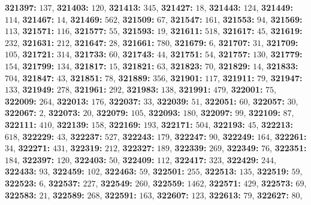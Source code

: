 \textsf{\bfseries 321397:} $137$, \textsf{\bfseries 321403:} $120$, \textsf{\bfseries 321413:} $345$, \textsf{\bfseries 321427:} $18$, \textsf{\bfseries 321443:} $124$, \textsf{\bfseries 321449:} $114$, \textsf{\bfseries 321467:} $14$, \textsf{\bfseries 321469:} $562$, \textsf{\bfseries 321509:} $67$, \textsf{\bfseries 321547:} $161$, \textsf{\bfseries 321553:} $94$, \textsf{\bfseries 321569:} $113$, \textsf{\bfseries 321571:} $116$, \textsf{\bfseries 321577:} $55$, \textsf{\bfseries 321593:} $19$, \textsf{\bfseries 321611:} $518$, \textsf{\bfseries 321617:} $45$, \textsf{\bfseries 321619:} $232$, \textsf{\bfseries 321631:} $212$, \textsf{\bfseries 321647:} $28$, \textsf{\bfseries 321661:} $780$, \textsf{\bfseries 321679:} $6$, \textsf{\bfseries 321707:} $31$, \textsf{\bfseries 321709:} $105$, \textsf{\bfseries 321721:} $314$, \textsf{\bfseries 321733:} $60$, \textsf{\bfseries 321743:} $44$, \textsf{\bfseries 321751:} $54$, \textsf{\bfseries 321757:} $130$, \textsf{\bfseries 321779:} $154$, \textsf{\bfseries 321799:} $134$, \textsf{\bfseries 321817:} $15$, \textsf{\bfseries 321821:} $63$, \textsf{\bfseries 321823:} $70$, \textsf{\bfseries 321829:} $14$, \textsf{\bfseries 321833:} $704$, \textsf{\bfseries 321847:} $43$, \textsf{\bfseries 321851:} $78$, \textsf{\bfseries 321889:} $356$, \textsf{\bfseries 321901:} $117$, \textsf{\bfseries 321911:} $79$, \textsf{\bfseries 321947:} $133$, \textsf{\bfseries 321949:} $278$, \textsf{\bfseries 321961:} $292$, \textsf{\bfseries 321983:} $138$, \textsf{\bfseries 321991:} $479$, \textsf{\bfseries 322001:} $75$, \textsf{\bfseries 322009:} $264$, \textsf{\bfseries 322013:} $176$, \textsf{\bfseries 322037:} $33$, \textsf{\bfseries 322039:} $51$, \textsf{\bfseries 322051:} $60$, \textsf{\bfseries 322057:} $30$, \textsf{\bfseries 322067:} $2$, \textsf{\bfseries 322073:} $20$, \textsf{\bfseries 322079:} $105$, \textsf{\bfseries 322093:} $180$, \textsf{\bfseries 322097:} $99$, \textsf{\bfseries 322109:} $87$, \textsf{\bfseries 322111:} $410$, \textsf{\bfseries 322139:} $158$, \textsf{\bfseries 322169:} $193$, \textsf{\bfseries 322171:} $504$, \textsf{\bfseries 322193:} $45$, \textsf{\bfseries 322213:} $618$, \textsf{\bfseries 322229:} $43$, \textsf{\bfseries 322237:} $527$, \textsf{\bfseries 322243:} $179$, \textsf{\bfseries 322247:} $90$, \textsf{\bfseries 322249:} $164$, \textsf{\bfseries 322261:} $34$, \textsf{\bfseries 322271:} $431$, \textsf{\bfseries 322319:} $212$, \textsf{\bfseries 322327:} $189$, \textsf{\bfseries 322339:} $269$, \textsf{\bfseries 322349:} $76$, \textsf{\bfseries 322351:} $184$, \textsf{\bfseries 322397:} $120$, \textsf{\bfseries 322403:} $50$, \textsf{\bfseries 322409:} $112$, \textsf{\bfseries 322417:} $323$, \textsf{\bfseries 322429:} $244$, \textsf{\bfseries 322433:} $93$, \textsf{\bfseries 322459:} $102$, \textsf{\bfseries 322463:} $59$, \textsf{\bfseries 322501:} $255$, \textsf{\bfseries 322513:} $135$, \textsf{\bfseries 322519:} $59$, \textsf{\bfseries 322523:} $6$, \textsf{\bfseries 322537:} $227$, \textsf{\bfseries 322549:} $260$, \textsf{\bfseries 322559:} $1462$, \textsf{\bfseries 322571:} $429$, \textsf{\bfseries 322573:} $69$, \textsf{\bfseries 322583:} $21$, \textsf{\bfseries 322589:} $268$, \textsf{\bfseries 322591:} $163$, \textsf{\bfseries 322607:} $123$, \textsf{\bfseries 322613:} $79$, \textsf{\bfseries 322627:} $80$, 

